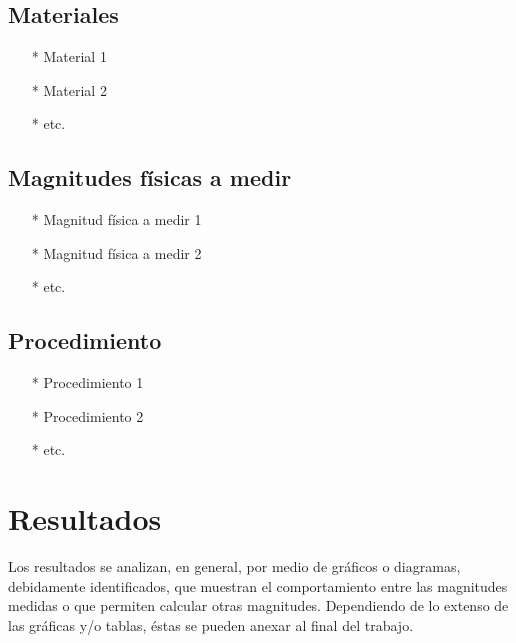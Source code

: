 \documentclass[osajnl,twocolumn,showpacs,superscriptaddress,10pt]{revtex4-1}
\begin{document}
\subsection{Materiales}

\begin{itemize}
    \item[*] Material 1
    \item[*] Material 2
    \item[*] etc.
\end{itemize}

\subsection{Magnitudes físicas a medir}

\begin{itemize}
    \item[*] Magnitud física a medir 1
    \item[*] Magnitud física a medir 2
    \item[*] etc.
\end{itemize}


\subsection{Procedimiento}

\begin{enumerate}
    \item[*] Procedimiento 1
    \item[*] Procedimiento 2
    \item[*] etc.
\end{enumerate}


\section{Resultados}

    Los resultados se analizan, en general, por medio de gráficos o diagramas, debidamente identificados, que muestran el comportamiento entre las magnitudes medidas o que permiten calcular otras magnitudes. Dependiendo de lo extenso de las gráficas y/o tablas, éstas se pueden anexar al final del trabajo.\\
   
\end{document}
